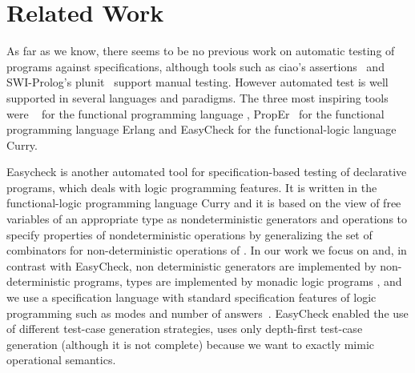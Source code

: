 
\section{Related Work} 
\label{sec:rel-work}


As far as we know, there seems to be no previous work on automatic
testing of \Prolog programs against specifications, although  tools such
as {\sf ciao}'s assertions~\cite{ciao-prolog} and {\sf SWI-Prolog}'s {\sf plunit}~\cite{swi-prolog}  support  manual testing.
%
However automated test is well supported in several languages and paradigms. 
%
The three most inspiring tools were \QuickCheck~\cite{quickcheck} for the
functional programming language \Haskell, {\sf PropEr}~\cite{papadakis2011proper} for the
functional programming language {\sf Erlang}
and {\sf EasyCheck} \cite{christiansen2008easycheck}  for
the functional-logic language {\sf Curry}.


{\sf Easycheck} is another automated tool for specification-based testing of
declarative programs, which deals with logic programming features.
%
It is written in the functional-logic programming language Curry and it
is based on the view of free variables of an appropriate type as
nondeterministic generators \cite{antoy2006overlapping} and operations to specify properties of
nondeterministic operations by generalizing the set of combinators for
non-deterministic operations of \QuickCheck.
%
In our work we focus on \Prolog{} and, in contrast with {\sf EasyCheck}, non
deterministic generators are implemented by non-deterministic \Prolog{}
programs, types are implemented by monadic logic programs \cite{fruhwirth1991logic,florido1992types}, and
we use a specification language with standard specification features of
logic programming such as modes and number of answers~\cite{Deville1990logprog}.
{\sf EasyCheck} enabled the use of different test-case generation strategies,
\plqc{} uses only depth-first test-case generation (although it is
not complete) because we want to exactly mimic \Prolog{} operational
semantics.


